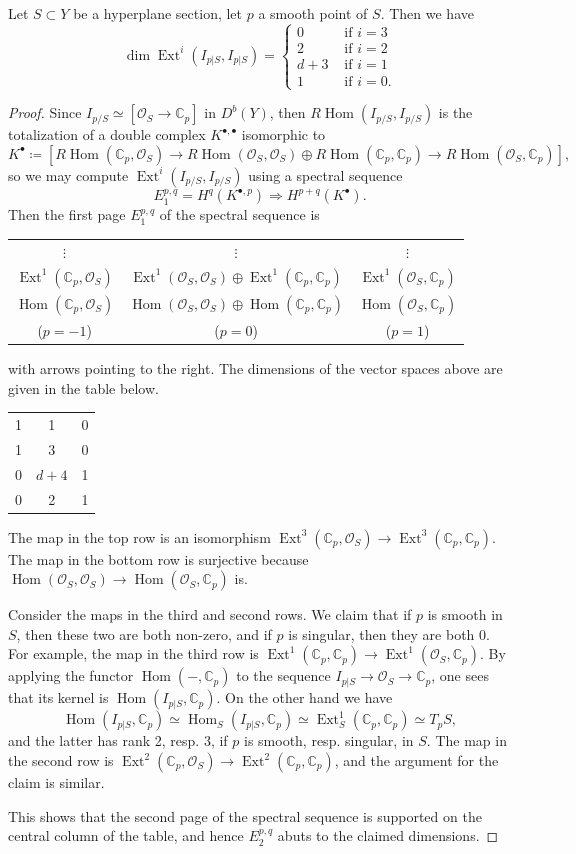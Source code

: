 \documentclass[10pt,a4paper]{amsart}
\DeclareMathOperator{\Ext}{Ext}
\DeclareMathOperator{\Hom}{Hom}
\newcommand{\C}{\mathbb{C}}
\newcommand{\sO}{\mathcal{O}}
\begin{document}
\begin{lemma}\label{d+3}
Let $S\subset Y$ be a hyperplane section, let $p$ a smooth  point of $S$. Then we have
$$\dim \Ext^i(I_{p|S},I_{p|S})=\begin{cases}
0 & \text{ if }i=3\\
2 & \text{ if }i=2\\
d+3 & \text{ if }i=1\\
1  & \text{ if }i=0.\end{cases}
$$  
\end{lemma}

\begin{proof}
Since $I_{p/S}\simeq[\sO_S\rightarrow \C_p]$ in $D^b(Y)$, then 
$R\Hom( I_{p/S},I_{p/S})$ is the totalization of a double complex $K^{\bullet,\bullet}$ isomorphic to 
$$K^\bullet\coloneqq \left[R\Hom(\C_p,\sO_S)\rightarrow R\Hom(\sO_S,\sO_S)\oplus R\Hom(\C_p,\C_p)\rightarrow R\Hom(\sO_S,\C_p)\right],$$ so we may compute $\Ext^i( I_{p/S},I_{p/S})$ using a spectral sequence
$$E_1^{p,q}=H^q(K^{\bullet,p})\Rightarrow H^{p+q}(K^\bullet).$$
Then the first page $E^{p,q}_1$ of the spectral sequence is

\begin{center}
\begin{tabular}{c|cc}
$\vdots$ & $\vdots$ & $\vdots$\\
 $\Ext^1(\C_p,\sO_S)$ & $\Ext^1(\sO_S,\sO_S)\oplus \Ext^1(\C_p,\C_p)$ &$\Ext^1(\sO_S,\C_p)$\\
$\Hom(\C_p,\sO_S)$ & $\Hom(\sO_S,\sO_S)\oplus \Hom(\C_p,\C_p)$ &$\Hom(\sO_S,\C_p)$\\
\hline
($p=-1$)&($p=0$)&($p=1$)
\end{tabular} 
\end{center}
with arrows pointing to the right. The dimensions of the vector spaces above are given in the table below.
\begin{center}
\begin{tabular}{c|cc}
1 & 1 &0\\
1 & 3 &0\\
0 & $d+4$ &1\\
0 & 2 &1\\
\hline
\end{tabular}
\end{center}
The map in the top row is an isomorphism $\Ext^3(\C_p,\sO_S)\rightarrow \Ext^3(\C_p,\C_p)$. The map in the bottom row is  surjective because $\Hom(\sO_S,\sO_S)\rightarrow \Hom(\sO_S,\C_p)$ is.

Consider the maps in the third and second rows. We claim that if $p$ is smooth in $S$, then these two are both non-zero, and if $p$ is singular, then they are both $0$. 
For example, the map in the third row is $\Ext^1(\C_p,\C_p)\rightarrow \Ext^1(\sO_S,\C_p)$. By applying the functor $\Hom(-,\C_p)$ to the sequence $I_{p|S} \to \sO_S \to\C_p$, one sees that its kernel is $\Hom(I_{p|S},\C_p)$. On the other hand we have 
\[ \Hom(I_{p|S},\C_p)\simeq \Hom_S(I_{p|S},\C_p)\simeq \Ext^1_S(\C_p,\C_p)\simeq T_p S,\]
and the latter has rank 2, resp. 3, if $p$ is smooth, resp. singular, in $S$.
The map in the second row is $\Ext^2(\C_p,\sO_S)\to \Ext^2(\C_p,\C_p)$, and the argument for the claim is similar.

This shows that the second page of the spectral sequence is supported on the central column of the table, and hence $E_2^{p,q}$ abuts to the claimed dimensions.
\end{proof}
\end{document}
